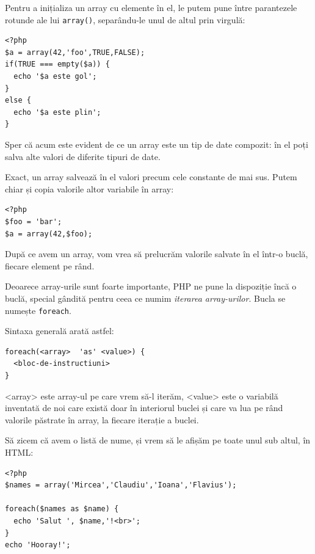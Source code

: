 Pentru a inițializa un array cu elemente în el, le putem
pune între parantezele rotunde ale lui \texttt{array()},
separându-le unul de altul prin virgulă:
\begin{lstlisting}
<?php
$a = array(42,'foo',TRUE,FALSE);
if(TRUE === empty($a)) {
  echo '$a este gol';
}
else {
  echo '$a este plin';
}
\end{lstlisting}
Sper că acum este evident de ce un array este un tip de
date compozit: în el poți salva alte valori de diferite tipuri
de date.

Exact, un array salvează în el valori precum cele constante
de mai sus. Putem chiar și copia valorile altor variabile
în array:
\begin{lstlisting}
<?php
$foo = 'bar';
$a = array(42,$foo);
\end{lstlisting}

După ce avem un array, vom vrea să prelucrăm valorile
salvate în el într-o buclă, fiecare element pe rând.

Deoarece array-urile sunt foarte importante, PHP
ne pune la dispoziție încă o buclă, special gândită
pentru ceea ce numim \textsl{iterarea array-urilor}.
Bucla se numește \texttt{foreach}.

Sintaxa generală arată astfel:
\begin{verbatim}
foreach(<array>  'as' <value>) {
  <bloc-de-instructiuni>
}
\end{verbatim}
<array> este array-ul pe care vrem să-l iterăm, <value>
este o variabilă inventată de noi care există
doar în interiorul buclei și care va lua pe rând
valorile păstrate în array, la fiecare iterație a buclei.

Să zicem că avem o listă de nume, și vrem să le afișăm pe toate
unul sub altul, în HTML:
\begin{lstlisting}
<?php
$names = array('Mircea','Claudiu','Ioana','Flavius');

foreach($names as $name) {
  echo 'Salut ', $name,'!<br>';
}
echo 'Hooray!';
\end{lstlisting}

